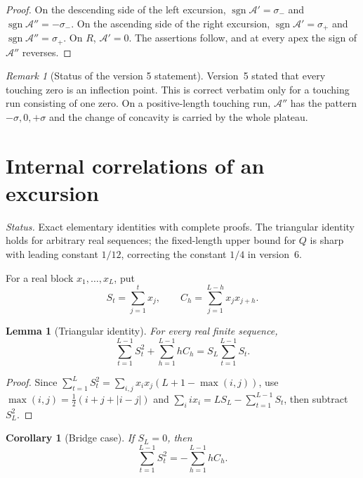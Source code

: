 \documentclass[11pt]{amsart}
\numberwithin{equation}{section}
\theoremstyle{plain}
\newtheorem{lemma}[theorem]{Lemma}
\newtheorem{corollary}[theorem]{Corollary}
\theoremstyle{definition}
\theoremstyle{remark}
\newtheorem{remark}[theorem]{Remark}
\DeclareMathOperator{\sgn}{sgn}
\newcommand{\Anet}{\mathcal{A}}
\begin{document}
\begin{proof}
On the descending side of the left excursion,
$\sgn\Anet'=\sigma_-$ and $\sgn\Anet''=-\sigma_-$.  On the ascending side
of the right excursion, $\sgn\Anet'=\sigma_+$ and
$\sgn\Anet''=\sigma_+$.  On $R$, $\Anet'=0$.  The assertions follow, and at
every apex the sign of $\Anet''$ reverses.
\end{proof}

\begin{remark}[Status of the version 5 statement]
\label{rem:critical_v5}
Version~5 stated that every touching zero is an inflection point.  This is
correct verbatim only for a touching run consisting of one zero.  On a
positive-length touching run, $\Anet''$ has the pattern
$-\sigma,0,+\sigma$ and the change of concavity is carried by the whole
plateau.
\end{remark}

\section{Internal correlations of an excursion}
\label{sec:internal_corr}

\noindent\emph{Status.} Exact elementary identities with complete proofs.
The triangular identity holds for arbitrary real sequences; the fixed-length
upper bound for $Q$ is sharp with leading constant $1/12$, correcting the
constant $1/4$ in version~6.

For a real block $x_1,\dots,x_L$, put
\begin{equation}
\label{eq:block_def}
S_t=\sum_{j=1}^t x_j,\qquad
C_h=\sum_{j=1}^{L-h}x_jx_{j+h}.
\end{equation}

\begin{lemma}[Triangular identity]
\label{lem:triangular-corr}
For every real finite sequence,
\begin{equation}
\label{eq:general-triangular}
\sum_{t=1}^{L-1}S_t^2+\sum_{h=1}^{L-1}hC_h
=S_L\sum_{t=1}^{L-1}S_t.
\end{equation}
\end{lemma}

\begin{proof}
Since
$\sum_{t=1}^{L}S_t^2=\sum_{i,j}x_ix_j(L+1-\max(i,j))$, use
$\max(i,j)=\tfrac12(i+j+|i-j|)$ and
$\sum_i i x_i=LS_L-\sum_{t=1}^{L-1}S_t$, then subtract $S_L^2$.
\end{proof}

\begin{corollary}[Bridge case]
\label{cor:bridge}
If $S_L=0$, then
\begin{equation}
\label{eq:bridge-triangular}
\sum_{t=1}^{L-1}S_t^2=-\sum_{h=1}^{L-1}hC_h.
\end{equation}
\end{corollary}
\end{document}
